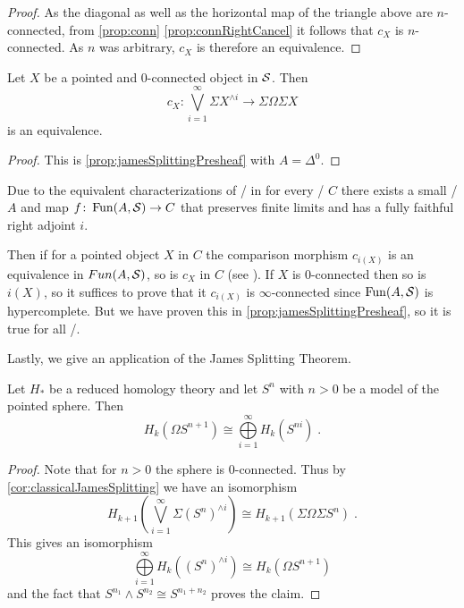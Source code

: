 \begin{prop}
\begin{proof}
        As the diagonal as well as the horizontal map of the triangle above are $n$-connected, from \cref{prop:conn} \ref{prop:connRightCancel} it follows that $c_X$ is $n$-connected. 
        As $n$ was arbitrary, $c_X$ is therefore an equivalence.
    \end{proof}
\end{prop}
\begin{corollary}\label{cor:classicalJamesSplitting}
    Let $X$ be a pointed and $0$-connected object in $\mathcal{S}$.
    Then     
    \begin{equation*}
        c_X\colon\bigvee\limits_{i=1}^{\infty}\Sigma X^{\wedge i}\to\Sigma\Omega\Sigma X
    \end{equation*}
    is an equivalence. 
    \begin{proof}
        This is \cref{prop:jamesSplittingPresheaf} with $A=\Delta^0$.
    \end{proof}
\end{corollary}
\begin{remark}\label{rem:genTopoiComparisonMapEq}
    Due to the equivalent characterizations of \inftytops/ in \cite[Definition 6.1.0.6]{HTT} for every \inftytop/ $C$ there exists a small \inftycat/ $A$ and map $f\colon\operatorname{Fun}(A,\mathcal{S})\to C$ that preserves finite limits and has a fully faithful right adjoint $i$.
    
    Then if for a pointed object $X$ in $C$ the comparison morphism $c_{i(X)}$ is an equivalence in $Fun(A,\mathcal{S})$, so is $c_X$ in $C$ (see \cite[Lemma 4.17]{splittings_21}).
    If $X$ is $0$-connected then so is $i(X)$, so it suffices to prove that it $c_{i(X)}$ is $\infty$-connected since $\operatorname{Fun}(A,\mathcal{S})$ is hypercomplete. 
    But we have proven this in \cref{prop:jamesSplittingPresheaf}, so it is true for all \inftytops/.
\end{remark}
Lastly, we give an application of the James Splitting Theorem.
\begin{lemma}\label{lem:reducedHomLoopOfSpheres}
    Let $H_*$ be a reduced homology theory and let $S^n$ with $n>0$ be a model of the pointed sphere.
    Then
    \begin{equation*}
        H_k(\Omega S^{n+1})\cong\bigoplus\limits_{i=1}^{\infty}H_k(S^{ni})\;.
    \end{equation*}
    \begin{proof}
        Note that for $n>0$ the sphere is $0$-connected.
        Thus by \cref{cor:classicalJamesSplitting} we have an isomorphism 
        \begin{equation*}
            H_{k+1}\left(\bigvee\limits_{i=1}^{\infty}\Sigma \left(S^n\right)^{\wedge i}\right)\cong H_{k+1}\left(\Sigma\Omega\Sigma S^n\right)\;.
        \end{equation*}
        This gives an isomorphism
        \begin{equation*}
            \bigoplus\limits_{i=1}^{\infty}H_k\left(\left(S^n\right)^{\wedge i}\right)\cong H_k\left(\Omega S^{n+1}\right)
        \end{equation*}
        and the fact that $S^{n_1}\wedge S^{n_2}\cong S^{n_1+n_2}$ proves the claim.
    \end{proof}
\end{lemma}
